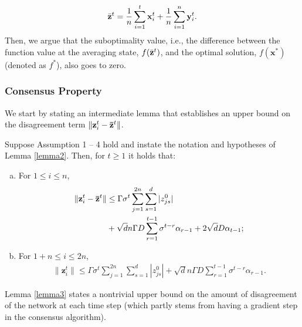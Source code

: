 \begin{equation}
   \Bar{\mathbf{z}}^t=\frac{1}{n}\sum_{i=1}^t \mathbf{x}_i^t +\frac{1}{n}\sum_{i=1}^n \mathbf{y}_i^t .
\end{equation}
Then, we argue that the suboptimality value, i.e., the difference between the function value at the averaging state, $f(\Bar{\mathbf{z}}^t)$, and the optimal solution, $f(\mathbf{x}^*)$ (denoted as $f^*$), also goes to zero. 
\subsubsection{Consensus Property}
We start by stating an intermediate lemma that establishes an upper bound on the disagreement term $\|\mathbf{z}_i^t-\mathbf{\Bar{z}}^t\|$.
\begin{lemma}\label{lemma3}
Suppose Assumption 1 -- 4 hold and instate the notation and hypotheses of Lemma \ref{lemma2}. Then, for $t\geq 1$ it holds that:
\begin{enumerate}[(a)]
    \item For $1 \leq i \leq n$, 
    \begin{equation}
            \begin{aligned}
    \|\mathbf{z}_i^t-\mathbf{\Bar{z}}^t\| & \leq \Gamma \sigma^{t}\sum_{j=1}^{2n}\sum_{s=1}^d |z^0_{js}|\\
     & +\sqrt{d}n\Gamma D\sum_{r=1}^{t-1}\sigma^{t-r}\alpha_{r-1}+2\sqrt{d} D\alpha_{t-1};
    \end{aligned}
    \end{equation}
    \item  For $1+n \leq i \leq 2n$, 
    \begin{equation}
    \begin{aligned}
    \|\mathbf{z}_i^t\| \leq \Gamma \sigma^{t}\sum_{j=1}^{2n}\sum_{s=1}^d |z^0_{js}|  +\sqrt{d} n\Gamma D\sum_{r=1}^{t-1}\sigma^{t-r}\alpha_{r-1}.
    \end{aligned}
    \end{equation}
\end{enumerate}
\end{lemma}
Lemma \ref{lemma3} states a nontrivial upper bound on the amount of disagreement of the network at each time step (which partly stems from having a gradient step in the consensus algorithm). 
